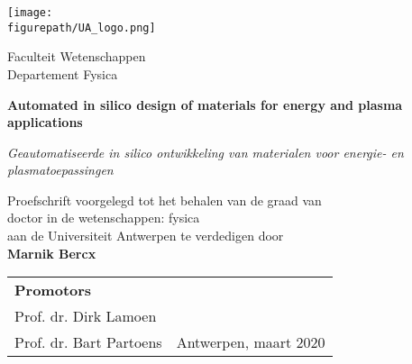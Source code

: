 \begin{titlepage}
   \begin{center}
       \vspace*{1cm}
       
       \texttt{[image: \\figurepath/UA\_logo.png]}
       
       \vspace{1cm}
         
       Faculteit Wetenschappen\\
       Departement Fysica\\
       
       \vspace{3cm}
       
       {\huge
       \textbf{Automated in silico design of materials for energy and plasma applications}
       }
 
       \vspace{0.5cm}
       \textit{Geautomatiseerde in silico ontwikkeling van materialen voor energie- en plasmatoepassingen}
 
       \vfill
       
       Proefschrift voorgelegd tot het behalen van de graad van \\
       doctor in de wetenschappen: fysica \\
       aan de Universiteit Antwerpen te verdedigen door \\
       
        \vspace{1cm}
        \textbf{Marnik Bercx}
       
       \vfill
       
       \begin{tabular}{l @{\hskip 18 em} r}
       \textbf{Promotors} \\ Prof. dr. Dirk Lamoen \\ Prof. dr. Bart Partoens
       & Antwerpen, maart 2020
       \end{tabular}
       
 
       \vspace{0.8cm}
 
       
 
   \end{center}
\end{titlepage}
